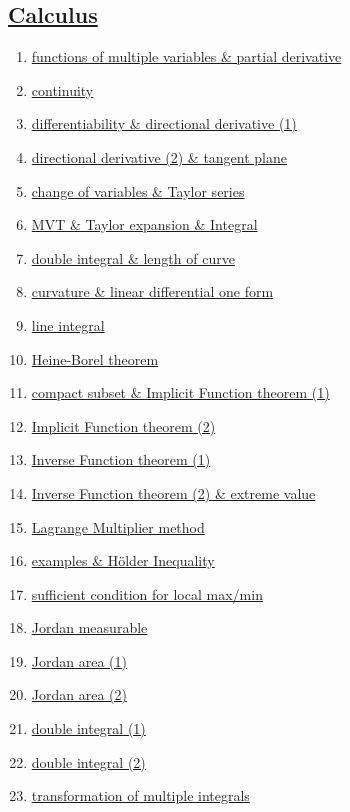 \documentclass[11pt]{article}
\begin{document}
\subsection*{\href{https://www.youtube.com/playlist?list=PLVJXJebpO4Pi_4cETi8EL19qJLdcLEW2a&si=YwWo1F4e-o_KZ5_s}{Calculus }}

\vspace{-0.5cm}

\begin{enumerate}
	\item \href{URL}{functions of multiple variables \& partial derivative}	%
	\item \href{URL}{continuity}	%
	\item \href{URL}{differentiability \& directional derivative (1)}	%
	\item \href{URL}{directional derivative (2) \& tangent plane}	%
	\item \href{URL}{change of variables \& Taylor series}	%
	\item \href{URL}{MVT \& Taylor expansion \& Integral}	%
	\item \href{URL}{double integral \& length of curve}	%
	\item \href{URL}{curvature \& linear differential one form}	%
	\item \href{URL}{line integral}	%
	\item \href{URL}{Heine-Borel theorem}	%
	\item \href{URL}{compact subset \& Implicit Function theorem (1)}	%
	\item \href{URL}{Implicit Function theorem (2)}	%
	\item \href{URL}{Inverse Function theorem (1)}	%
	\item \href{URL}{Inverse Function theorem (2) \& extreme value}	%
	\item \href{URL}{Lagrange Multiplier method}	%
	\item \href{URL}{examples \& H{\"o}lder Inequality}	%
	\item \href{URL}{sufficient condition for local max/min}	%
	\item \href{URL}{Jordan measurable}	%
	\item \href{URL}{Jordan area (1)}	%
	\item \href{URL}{Jordan area (2)}	%
	\item \href{URL}{double integral (1)}	%
	\item \href{URL}{double integral (2)}	%
	\item \href{URL}{transformation of multiple integrals}	%

\end{enumerate}
\end{document}
